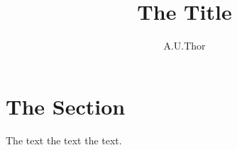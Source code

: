\documentclass[11pt,a4paper]{scrartcl}
\begin{document}

\title{The Title}
\author{A.U.Thor}
\maketitle

\section{The Section}

The text the text the text.
\end{document}
